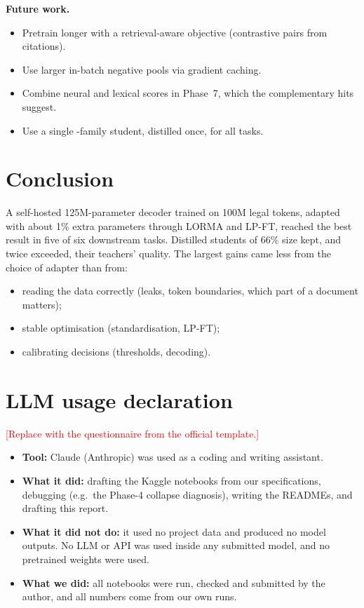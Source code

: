 \textbf{Future work.}
\begin{itemize}
\item Pretrain longer with a retrieval-aware objective (contrastive pairs from citations).
\item Use larger in-batch negative pools via gradient caching.
\item Combine neural and lexical scores in Phase~7, which the complementary hits suggest.
\item Use a single \A-family student, distilled once, for all tasks.
\end{itemize}

\section{Conclusion}
A self-hosted 125M-parameter decoder trained on 100M legal tokens, adapted with about 1\% extra parameters through LORMA and LP-FT, reached the best result in five of six downstream tasks. Distilled students of 66\% size kept, and twice exceeded, their teachers' quality.
The largest gains came less from the choice of adapter than from:
\begin{itemize}
\item reading the data correctly (leaks, token boundaries, which part of a document matters);
\item stable optimisation (standardisation, LP-FT);
\item calibrating decisions (thresholds, decoding).
\end{itemize}

\section*{LLM usage declaration}
\textcolor{red}{[Replace with the questionnaire from the official template.]}
\begin{itemize}
\item \textbf{Tool:} Claude (Anthropic) was used as a coding and writing assistant.
\item \textbf{What it did:} drafting the Kaggle notebooks from our specifications, debugging (e.g.\ the Phase-4 collapse diagnosis), writing the READMEs, and drafting this report.
\item \textbf{What it did not do:} it used no project data and produced no model outputs. No LLM or API was used inside any submitted model, and no pretrained weights were used.
\item \textbf{What we did:} all notebooks were run, checked and submitted by the author, and all numbers come from our own runs.
\end{itemize}

